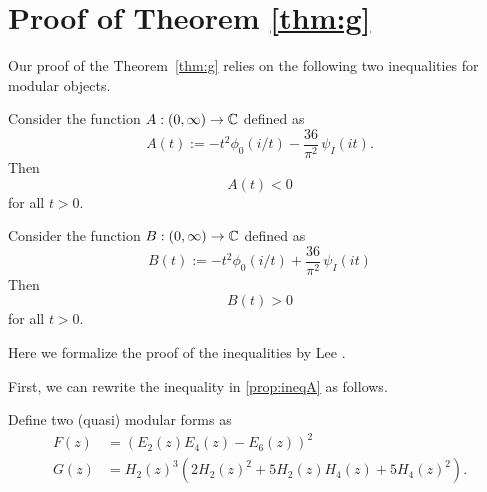 \section{Proof of Theorem \ref{thm:g}}\label{sec: g}
Our proof of the Theorem~\ref{thm:g} relies on the following two inequalities for modular objects.
\begin{proposition}\label{prop:ineqA}
Consider the function $A:(0,\infty)\to\mathbb{C}$ defined as
\begin{equation}\label{eqn:defA}
A(t):=-t^2\phi_0(i/t)-\frac{36}{\pi^2}\,\psi_I(it).
\end{equation}
Then
\begin{equation}\label{eqn:ineqA}
  A(t) < 0
\end{equation}
for all $t > 0$.
\end{proposition}

\begin{proposition}\label{prop:ineqB}
Consider the function $B:(0,\infty)\to\mathbb{C}$ defined as
\begin{equation}\label{eqn:defB}
  B(t) := -t^2\phi_0(i/t)+\frac{36}{\pi^2}\,\psi_I(it)
\end{equation}
Then
\begin{equation}\label{eqn:ineqB}
  B(t) > 0
\end{equation}
for all $t > 0$.
\end{proposition}

Here we formalize the proof of the inequalities by Lee \cite{Lee}.

First, we can rewrite the inequality in \ref{prop:ineqA} as follows.

\begin{definition}
Define two (quasi) modular forms as
\begin{align}
  F(z) &= (E_2(z) E_4(z) - E_6(z))^2 \label{eqn:defF} \\
  G(z) &= H_2(z)^{3} (2 H_{2}(z)^{2} + 5 H_{2}(z) H_{4}(z) + 5 H_{4}(z)^{2}). \label{eqn:defG}
\end{align}
\end{definition}

